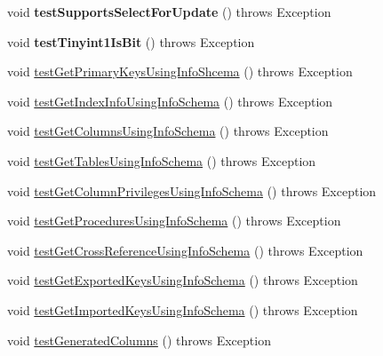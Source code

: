 \begin{DoxyCompactItemize}
\mbox{\label{classtestsuite_1_1simple_1_1_metadata_test_a630efab4cd749e3ac7289c477d005d67}} 
void {\bfseries test\+Supports\+Select\+For\+Update} ()  throws Exception 
\item 
\mbox{\label{classtestsuite_1_1simple_1_1_metadata_test_aff832408212ac641e00a62d686e3c528}} 
void {\bfseries test\+Tinyint1\+Is\+Bit} ()  throws Exception 
\item 
void \mbox{\hyperlink{classtestsuite_1_1simple_1_1_metadata_test_aec0bf7b994940c84160bf6100daf09bd}{test\+Get\+Primary\+Keys\+Using\+Info\+Shcema}} ()  throws Exception 
\item 
void \mbox{\hyperlink{classtestsuite_1_1simple_1_1_metadata_test_ab4ebb88c45acf9e7ce6b2420037c0153}{test\+Get\+Index\+Info\+Using\+Info\+Schema}} ()  throws Exception 
\item 
void \mbox{\hyperlink{classtestsuite_1_1simple_1_1_metadata_test_a96ed59d14490afb4e9e39aa8414acd0a}{test\+Get\+Columns\+Using\+Info\+Schema}} ()  throws Exception 
\item 
void \mbox{\hyperlink{classtestsuite_1_1simple_1_1_metadata_test_a480ded9536c6ed0ec7ae1cc82bc75a9b}{test\+Get\+Tables\+Using\+Info\+Schema}} ()  throws Exception 
\item 
void \mbox{\hyperlink{classtestsuite_1_1simple_1_1_metadata_test_a732360d39fdbee06f425012c99944216}{test\+Get\+Column\+Privileges\+Using\+Info\+Schema}} ()  throws Exception 
\item 
void \mbox{\hyperlink{classtestsuite_1_1simple_1_1_metadata_test_a2b94ef57c9572c0d5351c4ca8201b677}{test\+Get\+Procedures\+Using\+Info\+Schema}} ()  throws Exception 
\item 
void \mbox{\hyperlink{classtestsuite_1_1simple_1_1_metadata_test_a5c35cdbd777234219930a906ee096e93}{test\+Get\+Cross\+Reference\+Using\+Info\+Schema}} ()  throws Exception 
\item 
void \mbox{\hyperlink{classtestsuite_1_1simple_1_1_metadata_test_ae23d4ce9f6bff53b3ea3033d6a7f82a7}{test\+Get\+Exported\+Keys\+Using\+Info\+Schema}} ()  throws Exception 
\item 
void \mbox{\hyperlink{classtestsuite_1_1simple_1_1_metadata_test_aaef304b87a16efa2655e6e93ca030117}{test\+Get\+Imported\+Keys\+Using\+Info\+Schema}} ()  throws Exception 
\item 
void \mbox{\hyperlink{classtestsuite_1_1simple_1_1_metadata_test_a27296d9b08d2b4d91aa016482c2cef68}{test\+Generated\+Columns}} ()  throws Exception 
\end{DoxyCompactItemize}
